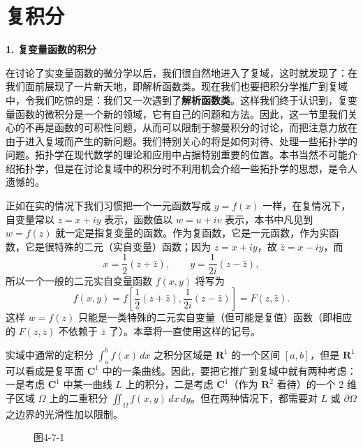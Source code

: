\section{复积分}

\noindent\textbf{1. 复变量函数的积分}

在讨论了实变量函数的微分学以后，我们很自然地进入了复域，这时就发现了：在我们面前展现了一片新天地，即解析函数类。现在我们也要把积分学推广到复域中，令我们吃惊的是：我们又一次遇到了\textbf{解析函数类}。这样我们终于认识到，复变量函数的微积分是一个新的领域，它有自己的问题和方法。因此，这一节里我们关心的不再是函数的可积性问题，从而可以限制于黎曼积分的讨论，而把注意力放在由于进入复域而产生的新问题。我们特别关心的将是如何对待、处理一些拓扑学的问题。拓扑学在现代数学的理论和应用中占据特别重要的位置。本书当然不可能介绍拓扑学，但是在讨论复域中的积分时不利用机会介绍一些拓扑学的思想，是令人遗憾的。

正如在实的情况下我们习惯把一个一元函数写成 $y=f(x)$ 一样，在复情况下，自变量常以 $z=x+iy$ 表示，函数值以 $w=u+iv$ 表示，本书中凡见到 $w=f(z)$ 就一定是指复变量的函数。作为复函数，它是一元函数，作为实函数，它是很特殊的二元（实自变量）函数；因为 $z=x+iy$，故 $\bar z=x-iy$，而
\[
 x=\frac12(z+\bar z),\qquad y=\frac1{2i}(z-\bar z),
\]
所以一个一般的二元实自变量函数 $f(x,y)$ 将写为
\[
 f(x,y)=f\!\left[\frac12(z+\bar z),\frac1{2i}(z-\bar z)\right]=F(z,\bar z).
\]
这样 $w=f(z)$ 只能是一类特殊的二元实自变量（但可能是复值）函数（即相应的 $F(z,\bar z)$ 不依赖于 $\bar z$ 了）。本章将一直使用这样的记号。

实域中通常的定积分 $\int_a^b f(x)\,dx$ 之积分区域是 $\mathbf R^1$ 的一个区间 $[a,b]$，但是 $\mathbf R^1$ 可以看成是复平面 $\mathbf C^1$ 中的一条曲线。因此，要把它推广到复域中就有两种考虑：一是考虑 $\mathbf C^1$ 中某一曲线 $L$ 上的积分，二是考虑 $\mathbf C^1$（作为 $\mathbf R^2$ 看待）的一个 2 维子区域 $\Omega$ 上的二重积分 $\iint_\Omega f(x,y)\,dx\,dy$。但在两种情况下，都需要对 $L$ 或 $\partial\Omega$ 之边界的光滑性加以限制。

\begin{figure}[htbp]
\centering
{}
\caption*{图4-7-1}
\end{figure}

